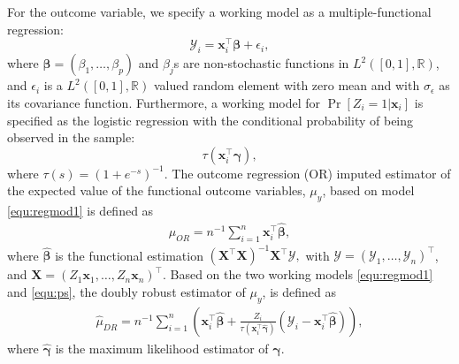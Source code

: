 \documentclass[12pt, A4]{article}
\newcommand{\SumOverN}{\sum_{i=1}^n}
\newcommand{\ObsCov}{\textbf{x}_i}
\newcommand{\LogCoe}{\boldsymbol{\gamma}}
\newcommand{\Parentheses}[1]{ \left( #1 \right) }
\begin{document}
        For the outcome variable, we specify a working model as a multiple-functional regression:
        \begin{equation}\label{equ:regmod1}
            \mathcal{Y}_i = \ObsCov^{\top}\boldsymbol{\beta} + \epsilon_i,
        \end{equation}
        where $\boldsymbol{\beta} = (\beta_1, \dots, \beta_p)$ and $\beta_j$s are non-stochastic functions in $L^2([0,1], \mathbb{R})$, and $\epsilon_i$ is a $L^2([0,1], \mathbb{R})$ valued random element with zero mean and with $\sigma_{\epsilon}$ as its covariance function.    
        Furthermore, a working model for $\Pr[ Z_i=1 | \ObsCov ]$ is specified as the logistic regression with the conditional probability of being observed in the sample:
            \begin{equation}\label{equ:ps}
               \tau(\ObsCov^{\top} \LogCoe),
            \end{equation}
        where $\tau(s) = (1+e^{-s})^{-1}$. 
        The outcome regression (OR) imputed estimator of the expected value of the functional outcome variables, $\mu_{y}$, based on model \eqref{equ:regmod1} is defined as 
            \begin{align}\label{equ:OR}
                \hat{\mu}_{OR} = n^{-1}\SumOverN \ObsCov^{\top}\hat{\boldsymbol{\beta}},
            \end{align}
        where $\hat{\boldsymbol{\beta}}$ is the functional estimation
            $
                \Parentheses{ \mathbf{X}^{\top}\mathbf{X} }^{-1} \mathbf{X}^{\top}\boldsymbol{\mathcal{Y}},
            $
        with 
        $\boldsymbol{\mathcal{Y}} = \Parentheses{\mathcal{Y}_1, \dots, \mathcal{Y}_n}^{\top}$, and $\mathbf{X} = \Parentheses{Z_1\mathbf{x}_1, \dots, Z_n\mathbf{x}_n}^{\top}$.
        Based on the two working models \eqref{equ:regmod1} and \eqref{equ:ps}, the doubly robust estimator of ${\mu}_{y}$, is defined as
            \begin{align}\label{equ:DR}
                \hat{\mu}_{DR} = n^{-1} \SumOverN \left( \ObsCov^{\top}\hat{\boldsymbol{\beta}} + \frac{Z_i}{\tau(\ObsCov^{\top}\hat{\LogCoe})}\Parentheses{\mathcal{Y}_i -\ObsCov^{\top}\hat{\boldsymbol{\beta}}}  \right),
            \end{align}
        where $\hat{\LogCoe}$ is the maximum likelihood estimator of $\LogCoe$.
\end{document}
